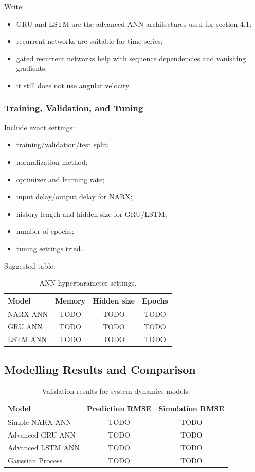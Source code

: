 \documentclass[conference]{IEEEtran}
\begin{document}
Write:
\begin{itemize}
    \item GRU and LSTM are the advanced ANN architectures used for section 4.1;
    \item recurrent networks are suitable for time series;
    \item gated recurrent networks help with sequence dependencies and vanishing gradients;
    \item it still does not use angular velocity.
\end{itemize}

\subsubsection{Training, Validation, and Tuning}
Include exact settings:
\begin{itemize}
    \item training/validation/test split;
    \item normalization method;
    \item optimizer and learning rate;
    \item input delay/output delay for NARX;
    \item history length and hidden size for GRU/LSTM;
    \item number of epochs;
    \item tuning settings tried.
\end{itemize}

Suggested table:
\begin{table}[h]
\centering
\caption{ANN hyperparameter settings.}
\begin{tabular}{lccc}
\toprule
Model & Memory & Hidden size & Epochs \\
\midrule
NARX ANN & TODO & TODO & TODO \\
GRU ANN & TODO & TODO & TODO \\
LSTM ANN & TODO & TODO & TODO \\
\bottomrule
\end{tabular}
\end{table}

\subsection{Modelling Results and Comparison}

\begin{table}[h]
\centering
\caption{Validation results for system dynamics models.}
\begin{tabular}{lcc}
\toprule
Model & Prediction RMSE & Simulation RMSE \\
\midrule
Simple NARX ANN & TODO & TODO \\
Advanced GRU ANN & TODO & TODO \\
Advanced LSTM ANN & TODO & TODO \\
Gaussian Process & TODO & TODO \\
\bottomrule
\end{tabular}
\end{table}
\end{document}
